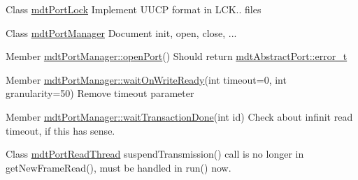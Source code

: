 \label{todo__todo000010}
\hypertarget{todo__todo000010}{}
 
\begin{DoxyDescription}
\item[Class \hyperlink{classmdt_port_lock}{mdtPortLock} ]Implement UUCP format in LCK.. files 
\end{DoxyDescription}

\label{todo__todo000022}
\hypertarget{todo__todo000022}{}
 
\begin{DoxyDescription}
\item[Class \hyperlink{classmdt_port_manager}{mdtPortManager} ]Document init, open, close, ...
\end{DoxyDescription}

\label{todo__todo000023}
\hypertarget{todo__todo000023}{}
 
\begin{DoxyDescription}
\item[Member \hyperlink{classmdt_port_manager_aab594613e8985590c835194efbc27b5e}{mdtPortManager::openPort}() ]Should return \hyperlink{classmdt_abstract_port_ad4121bb930c95887e77f8bafa065a85e}{mdtAbstractPort::error\_\-t} 
\end{DoxyDescription}

\label{todo__todo000020}
\hypertarget{todo__todo000020}{}
 
\begin{DoxyDescription}
\item[Member \hyperlink{classmdt_port_manager_a1ca92c5ac120d87e5b10bff54ed1aa5c}{mdtPortManager::waitOnWriteReady}(int timeout=0, int granularity=50) ]Remove timeout parameter 
\end{DoxyDescription}

\label{todo__todo000024}
\hypertarget{todo__todo000024}{}
 
\begin{DoxyDescription}
\item[Member \hyperlink{classmdt_port_manager_a5551802de2c08632078f2cc0e2607913}{mdtPortManager::waitTransactionDone}(int id) ]Check about infinit read timeout, if this has sense. 
\end{DoxyDescription}

\label{todo__todo000025}
\hypertarget{todo__todo000025}{}
 
\begin{DoxyDescription}
\item[Class \hyperlink{classmdt_port_read_thread}{mdtPortReadThread} ]suspendTransmission() call is no longer in getNewFrameRead(), must be handled in run() now. 
\end{DoxyDescription}

